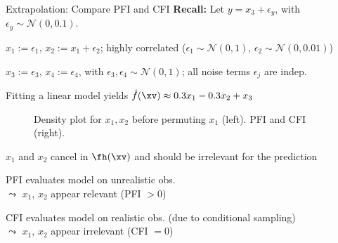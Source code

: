 \documentclass[10pt,compress,t,notes=noshow, xcolor=table]{beamer}
\begin{document}
\begin{framev}[align=top]{Extrapolation: Compare PFI and CFI}
\textbf{Recall:} Let $y = x_3 + \epsilon_y$, with $\epsilon_y \sim \mathcal{N}(0, 0.1)$.
\begin{itemizeM}
\item $x_1 := \epsilon_1$, $x_2 := x_1 + \epsilon_2$; highly correlated ($\epsilon_1 \sim \mathcal{N}(0,1)$, $\epsilon_2 \sim \mathcal{N}(0, 0.01)$)
\item $x_3 := \epsilon_3$, $x_4 := \epsilon_4$, with $\epsilon_3, \epsilon_4 \sim \mathcal{N}(0,1)$; all noise terms $\epsilon_j$ are indep.
\item Fitting a linear model yields $\hat{f}(\xv) \approx 0.3 x_1 - 0.3 x_2 + x_3$
\end{itemizeM}
\begin{figure}
{}
\caption{Density plot for $x_1, x_2$ before permuting $x_1$ (left). PFI and CFI (right).}
\end{figure}
\begin{itemizeS}
\item $x_1$ and $x_2$ cancel in $\fh(\xv)$ and should be irrelevant for the prediction
\item PFI evaluates model on unrealistic obs. \\$\leadsto$ $x_1$, $x_2$ appear relevant (PFI $> 0$)
\item CFI evaluates model on realistic obs. (due to conditional sampling) \\
$\leadsto$ $x_1$, $x_2$ appear irrelevant (CFI $= 0$)
\end{itemizeS}
\end{framev}


\endlecture
\end{document}
